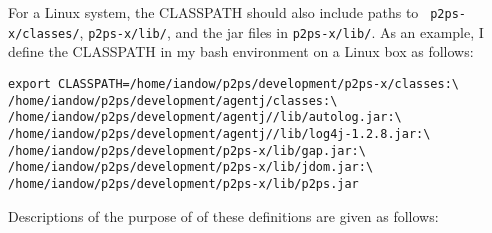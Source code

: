 For a Linux system, the CLASSPATH should also include paths to {\tt
p2ps-x/classes/}, {\tt p2ps-x/lib/}, and the jar files in {\tt p2ps-x/lib/}. 
As an example, I define the CLASSPATH in my bash environment on a Linux box as
follows:

\footnotesize
\begin{verbatim}
export CLASSPATH=/home/iandow/p2ps/development/p2ps-x/classes:\
/home/iandow/p2ps/development/agentj/classes:\
/home/iandow/p2ps/development/agentj//lib/autolog.jar:\
/home/iandow/p2ps/development/agentj//lib/log4j-1.2.8.jar:\
/home/iandow/p2ps/development/p2ps-x/lib/gap.jar:\
/home/iandow/p2ps/development/p2ps-x/lib/jdom.jar:\
/home/iandow/p2ps/development/p2ps-x/lib/p2ps.jar
\end{verbatim}
\normalsize

Descriptions of the purpose of of these definitions are given as follows:

